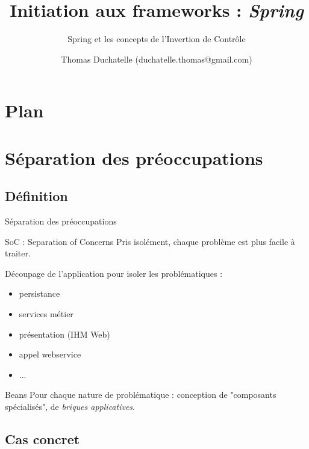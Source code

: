 \documentclass[compress]{beamer}%
\title{Initiation aux frameworks : \emph{Spring}}
\subtitle{Spring et les concepts de l'Invertion de Contrôle}
\author{Thomas Duchatelle (duchatelle.thomas@gmail.com)}
\institute{Capgemini, pour Yves Rocher}
\begin{document}
\frame{\titlepage}
  
\section*{Plan}
\frame{\tableofcontents[hideallsubsections]}
	
\section{Séparation des préoccupations}

\subsection{Définition}

\begin{frame}{Séparation des préoccupations}
	
	\begin{block}{SoC : Separation of Concerns}
	Pris isolément, chaque problème est plus facile à traiter.
	\end{block}

	\pause
	Découpage de l'application pour isoler les problématiques :
	\begin{itemize}
	\item persistance
	\item services métier
	\item présentation (IHM Web)
	\item appel webservice
	\item ...
	\end{itemize}
	
	\pause
	\begin{block}{Beans}
	Pour chaque nature de problématique : conception de "composants spécialisés", de \emph{briques applicatives}.
	\end{block}
\end{frame}

\subsection{Cas concret}
\end{document}
